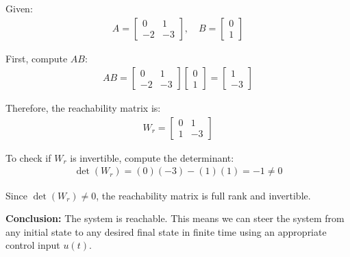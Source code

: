 \documentclass[11pt,a4paper]{article}
\begin{document}
Given:
\begin{align}
  A = \begin{bmatrix} 0 & 1 \\ -2 & -3 \end{bmatrix}, \quad B = \begin{bmatrix} 0 \\ 1 \end{bmatrix}
\end{align}

First, compute $AB$:
\begin{align}
  AB = \begin{bmatrix} 0 & 1 \\ -2 & -3 \end{bmatrix}\begin{bmatrix} 0 \\ 1 \end{bmatrix} = \begin{bmatrix} 1 \\ -3 \end{bmatrix}
\end{align}

Therefore, the reachability matrix is:
\begin{align}
  W_r = \begin{bmatrix} 0 & 1 \\ 1 & -3 \end{bmatrix}
\end{align}

To check if $W_r$ is invertible, compute the determinant:
\begin{align}
  \det(W_r) = (0)(-3) - (1)(1) = -1 \neq 0
\end{align}

Since $\det(W_r) \neq 0$, the reachability matrix is full rank and invertible.

\textbf{Conclusion:} The system is reachable. This means we can steer the system from any initial state to any desired final state in finite time using an appropriate control input $u(t)$.
\end{document}
